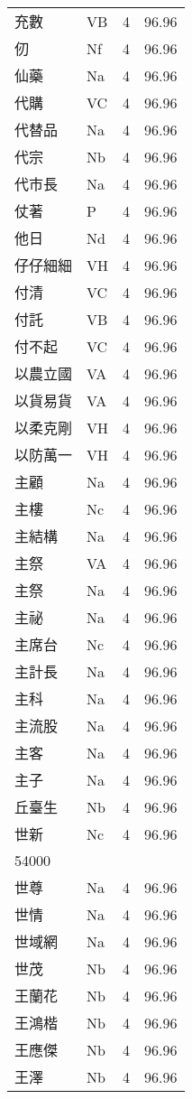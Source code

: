 \documentclass[twocolumn]{book}
\begin{document}
\begin{supertabular}{llrr}
充數 & VB & 4 &  96.96\\
仞 & Nf & 4 &  96.96\\
仙藥 & Na & 4 &  96.96\\
代購 & VC & 4 &  96.96\\
代替品 & Na & 4 &  96.96\\
代宗 & Nb & 4 &  96.96\\
代市長 & Na & 4 &  96.96\\
仗著 & P & 4 &  96.96\\
他日 & Nd & 4 &  96.96\\
仔仔細細 & VH & 4 &  96.96\\
付清 & VC & 4 &  96.96\\
付託 & VB & 4 &  96.96\\
付不起 & VC & 4 &  96.96\\
以農立國 & VA & 4 &  96.96\\
以貨易貨 & VA & 4 &  96.96\\
以柔克剛 & VH & 4 &  96.96\\
以防萬一 & VH & 4 &  96.96\\
主顧 & Na & 4 &  96.96\\
主樓 & Nc & 4 &  96.96\\
主結構 & Na & 4 &  96.96\\
主祭 & VA & 4 &  96.96\\
主祭 & Na & 4 &  96.96\\
主祕 & Na & 4 &  96.96\\
主席台 & Nc & 4 &  96.96\\
主計長 & Na & 4 &  96.96\\
主科 & Na & 4 &  96.96\\
主流股 & Na & 4 &  96.96\\
主客 & Na & 4 &  96.96\\
主子 & Na & 4 &  96.96\\
丘臺生 & Nb & 4 &  96.96\\
世新 & Nc & 4 &  96.96\\
54000\\
世尊 & Na & 4 &  96.96\\
世情 & Na & 4 &  96.96\\
世域網 & Na & 4 &  96.96\\
世茂 & Nb & 4 &  96.96\\
王蘭花 & Nb & 4 &  96.96\\
王鴻楷 & Nb & 4 &  96.96\\
王應傑 & Nb & 4 &  96.96\\
王澤 & Nb & 4 &  96.96\\

\end{supertabular}
\end{document}
